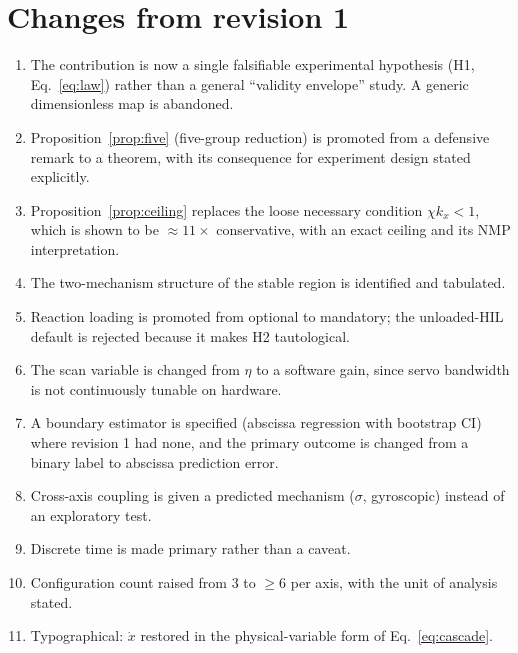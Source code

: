 \documentclass[11pt,a4paper]{article}
\begin{document}
\appendix
\section{Changes from revision 1}
\begin{enumerate}
\item The contribution is now a single falsifiable experimental hypothesis (H1, Eq.~\eqref{eq:law})
rather than a general ``validity envelope'' study. A generic dimensionless map is abandoned.
\item Proposition~\ref{prop:five} (five-group reduction) is promoted from a defensive remark to a
theorem, with its consequence for experiment design stated explicitly.
\item Proposition~\ref{prop:ceiling} replaces the loose necessary condition $\chi k_x<1$, which is
shown to be $\approx 11\times$ conservative, with an exact ceiling and its NMP interpretation.
\item The two-mechanism structure of the stable region is identified and tabulated.
\item Reaction loading is promoted from optional to mandatory; the unloaded-HIL default is rejected
because it makes H2 tautological.
\item The scan variable is changed from $\eta$ to a software gain, since servo bandwidth is not
continuously tunable on hardware.
\item A boundary estimator is specified (abscissa regression with bootstrap CI) where revision 1 had
none, and the primary outcome is changed from a binary label to abscissa prediction error.
\item Cross-axis coupling is given a predicted mechanism ($\sigma$, gyroscopic) instead of an
exploratory test.
\item Discrete time is made primary rather than a caveat.
\item Configuration count raised from 3 to $\geq 6$ per axis, with the unit of analysis stated.
\item Typographical: $\dot x$ restored in the physical-variable form of Eq.~\eqref{eq:cascade}.
\end{enumerate}
\end{document}

